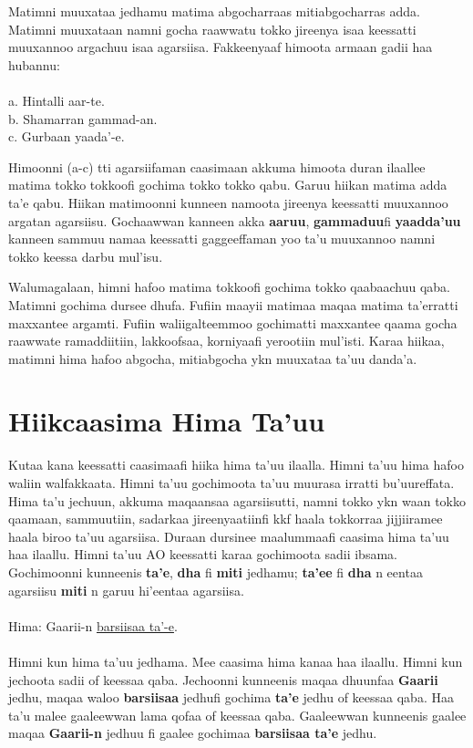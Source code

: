 \documentclass[11pt,b5paper]{book}
\begin{document}
Matimni muuxataa jedhamu matima abgocharraas mitiabgocharras adda. Matimni muuxataan namni gocha raawwatu tokko jireenya isaa keessatti muuxannoo argachuu isaa agarsiisa. Fakkeenyaaf himoota armaan gadii haa hubannu: \\
\\
a. Hintalli aar-te.\\
b. Shamarran gammad-an.\\
c. Gurbaan yaada’-e.

Himoonni (a-c) tti agarsiifaman caasimaan akkuma himoota duran ilaallee matima tokko tokkoofi gochima tokko tokko qabu. Garuu hiikan matima adda ta’e qabu. Hiikan matimoonni kunneen namoota jireenya keessatti muuxannoo argatan agarsiisu. Gochaawwan kanneen akka \textbf{aaruu}, \textbf{gammaduu}fi \textbf{yaadda’uu} kanneen sammuu namaa keessatti gaggeeffaman yoo ta’u muuxannoo namni tokko keessa darbu mul’isu.

Walumagalaan, himni hafoo matima tokkoofi gochima tokko qaabaachuu qaba. Matimni gochima dursee dhufa. Fufiin maayii matimaa maqaa matima ta’erratti maxxantee argamti. Fufiin waliigalteemmoo gochimatti maxxantee qaama gocha raawwate ramaddiitiin, lakkoofsaa, korniyaafi yerootiin mul’isti. Karaa hiikaa, matimni hima hafoo abgocha, mitiabgocha ykn muuxataa ta’uu danda’a.

\section{Hiikcaasima Hima Ta'uu}

Kutaa kana keessatti caasimaafi hiika hima ta’uu ilaalla. Himni ta’uu hima hafoo waliin walfakkaata. Himni ta’uu gochimoota ta’uu muurasa irratti bu’uureffata. Hima ta’u jechuun, akkuma maqaansaa agarsiisutti, namni tokko ykn waan tokko qaamaan, sammuutiin, sadarkaa jireenyaatiinfi kkf haala tokkorraa jijjiiramee haala biroo ta’uu agarsiisa. Duraan dursinee maalummaafi caasima hima ta’uu
haa ilaallu. Himni ta’uu AO keessatti karaa gochimoota sadii ibsama. Gochimoonni kunneenis \textbf{ta’e}, \textbf{dha} fi \textbf{miti} jedhamu; \textbf{ta’ee} fi \textbf{dha} n eentaa agarsiisu \textbf{miti} n garuu hi'eentaa agarsiisa. \\
\\
Hima: Gaarii-n \underline{barsiisaa ta’-e}. \\
\\

Himni kun hima ta’uu jedhama. Mee caasima hima kanaa haa ilaallu. Himni kun jechoota sadii of
keessaa qaba. Jechoonni kunneenis maqaa dhuunfaa \textbf{Gaarii} jedhu, maqaa waloo \textbf{barsiisaa} jedhufi gochima \textbf{ta’e} jedhu of keessaa qaba. Haa ta’u malee gaaleewwan lama qofaa of keessaa qaba. Gaaleewwan kunneenis gaalee maqaa \textbf{Gaarii-n} jedhuu fi gaalee gochimaa \textbf{barsiisaa ta’e} jedhu.
\end{document}
